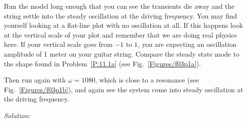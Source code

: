 \begin{enumerate}
\begin{enumerate}
\subprob Run the model long enough that you can see the transients die
away and the string settle into the steady oscillation at the
driving frequency. You may find yourself looking at a flat-line
plot with no oscillation at all. If this happens look at the
vertical scale of your plot and remember that we are doing real
physics here. If your vertical scale goes from $-1$ to $1$, you
are expecting an oscillation amplitude of 1 meter on your
guitar string. Compare the steady state mode to the shape found
in Problem~\ref{P:11.1a} (see Fig.~\ref{Figures/f03p1a}).

Then run again with $\omega=1080$, which is close to a
resonance (see Fig.~\ref{Figures/f03p1b}), and again see the system
come into steady oscillation at the driving frequency.
\end{enumerate}
\end{enumerate}
\ifsolutions
\textit{Solution:}\\
